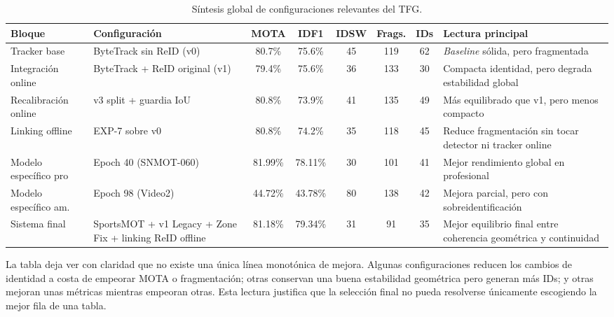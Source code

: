 \documentclass[../MAIN.tex]{subfiles}
\begin{document}
	\begin{table}[H]
		\centering
		\small
		\caption{Síntesis global de configuraciones relevantes del TFG.}
		\label{tab:cap13_megatabla}
		\setlength{\tabcolsep}{5pt}
		\renewcommand{\arraystretch}{1.15}
		\begin{tabular}{p{2.1cm} p{3.4cm} c c c c c p{3.6cm}}
			\toprule
			\textbf{Bloque} & \textbf{Configuración} & \textbf{MOTA} & \textbf{IDF1} & \textbf{IDSW} & \textbf{Frags.} & \textbf{IDs} & \textbf{Lectura principal} \\
			\midrule
			Tracker base
			& ByteTrack sin ReID (v0)
			& 80.7\% & 75.6\% & 45 & 119 & 62
			& \textit{Baseline} sólida, pero fragmentada \\
			
			Integración online
			& ByteTrack + ReID original (v1)
			& 79.4\% & 75.6\% & 36 & 133 & 30
			& Compacta identidad, pero degrada estabilidad global \\
			
			Recalibración online
			& v3 split + guardia IoU
			& 80.8\% & 73.9\% & 41 & 135 & 49
			& Más equilibrado que v1, pero menos compacto \\
			
			Linking offline
			& EXP-7 sobre v0
			& 80.8\% & 74.2\% & 35 & 118 & 45
			& Reduce fragmentación sin tocar detector ni tracker online \\
			
			Modelo específico pro
			& Epoch 40 (SNMOT-060)
			& 81.99\% & 78.11\% & 30 & 101 & 41
			& Mejor rendimiento global en profesional \\
			
			Modelo específico am.
			& Epoch 98 (Video2)
			& 44.72\% & 43.78\% & 80 & 138 & 42
			& Mejora parcial, pero con sobreidentificación \\
			
			Sistema final
			& SportsMOT + v1 Legacy + Zone Fix + linking ReID offline
			& 81.18\% & 79.34\% & 31 & 91 & 35
			& Mejor equilibrio final entre coherencia geométrica y continuidad \\
			\bottomrule
		\end{tabular}
	\end{table}
	
	La tabla deja ver con claridad que no existe una única línea monotónica de mejora. Algunas configuraciones reducen los cambios de identidad a costa de empeorar MOTA o fragmentación; otras conservan una buena estabilidad geométrica pero generan más IDs; y otras mejoran unas métricas mientras empeoran otras. Esta lectura justifica que la selección final no pueda resolverse únicamente escogiendo la mejor fila de una tabla.
	
\end{document}
